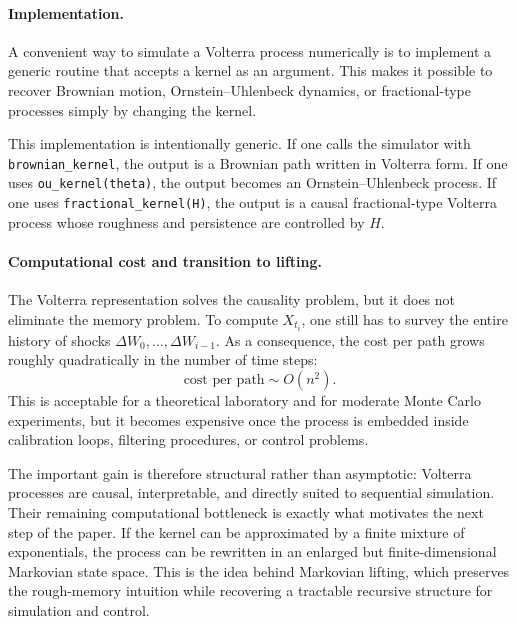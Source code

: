 \documentclass[a4paper,10pt,titlepage,oneside,openany]{book}
\theoremstyle{plain}
\theoremstyle{definition}
\theoremstyle{remark}
\newcommand{\1}{\mathbf{1}}
\begin{document}
\paragraph{Implementation.}

A convenient way to simulate a Volterra process numerically is to implement a generic routine that accepts a kernel as an argument. This makes it possible to recover Brownian motion, Ornstein--Uhlenbeck dynamics, or fractional-type processes simply by changing the kernel.

This implementation is intentionally generic. If one calls the simulator with \texttt{brownian\_kernel}, the output is a Brownian path written in Volterra form. If one uses \texttt{ou\_kernel(theta)}, the output becomes an Ornstein--Uhlenbeck process. If one uses \texttt{fractional\_kernel(H)}, the output is a causal fractional-type Volterra process whose roughness and persistence are controlled by \(H\).

\paragraph{Computational cost and transition to lifting.}

The Volterra representation solves the causality problem, but it does not eliminate the memory problem. To compute \(X_{t_i}\), one still has to survey the entire history of shocks \(\Delta W_0,\dots,\Delta W_{i-1}\). As a consequence, the cost per path grows roughly quadratically in the number of time steps:
\[
\text{cost per path} \sim O(n^2).
\]
This is acceptable for a theoretical laboratory and for moderate Monte Carlo experiments, but it becomes expensive once the process is embedded inside calibration loops, filtering procedures, or control problems.

The important gain is therefore structural rather than asymptotic: Volterra processes are causal, interpretable, and directly suited to sequential simulation. Their remaining computational bottleneck is exactly what motivates the next step of the paper. If the kernel can be approximated by a finite mixture of exponentials, the process can be rewritten in an enlarged but finite-dimensional Markovian state space. This is the idea behind Markovian lifting, which preserves the rough-memory intuition while recovering a tractable recursive structure for simulation and control.

\end{document}

